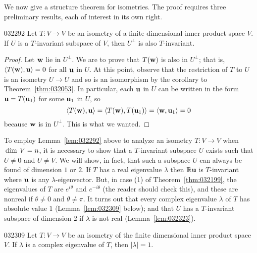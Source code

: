 We now give a structure theorem for isometries. The proof requires three preliminary results, each of interest in its own right.

\begin{lemma}{}{032292}
Let $T : V \to V$ be an isometry of a finite dimensional inner product space $V$. If $U$ is a $T$-invariant subspace of $V$, then $U^{\perp}$ is also $T$-invariant.
\end{lemma}

\begin{proof}
Let $\textbf{w}$ lie in $U^{\perp}$. We are to prove that $T(\textbf{w})$ is also in $U^{\perp}$; that is, $\langle T(\textbf{w}), \textbf{u} \rangle = 0$ for all $\textbf{u}$ in $U$. At this point, observe that the restriction of $T$ to $U$ is an isometry $U \to U$ and so is an isomorphism by the corollary to Theorem~\ref{thm:032053}. In particular, each $\textbf{u}$ in $U$ can be written in the form $\textbf{u} = T(\textbf{u}_{1})$ for some $\textbf{u}_{1}$ in $U$, so
\begin{equation*}
\langle T(\textbf{w}), \textbf{u} \rangle = \langle T(\textbf{w}), T(\textbf{u}_1) \rangle = \langle \textbf{w}, \textbf{u}_1 \rangle = 0
\end{equation*}
because $\textbf{w}$ is in $U^{\perp}$. This is what we wanted.
\end{proof}

To employ Lemma~\ref{lem:032292} above to analyze an isometry $T : V \to V$ when $\thinspace\operatorname{dim\medspace} V = n$, it is necessary to show that a $T$-invariant subspace $U$ exists such that $U \neq 0$ and $U \neq V$. We will show, in fact, that such a subspace $U$ can always be found of dimension $1$ or $2$. If $T$ has a real eigenvalue $\lambda$ then $\mathbb{R}\textbf{u}$ is $T$-invariant where $\textbf{u}$ is any $\lambda$-eigenvector. But, in case (1) of Theorem~\ref{thm:032199}, the eigenvalues of $T$ are $e^{i\theta}$ and $e^{-i\theta}$ (the reader should check this), and these are nonreal if $\theta \neq 0$ and $\theta \neq \pi$. It turns out that every complex eigenvalue $\lambda$ of $T$ has absolute value $1$ (Lemma~\ref{lem:032309} below); and that $U$ has a $T$-invariant subspace of dimension $2$ if $\lambda$ is not real (Lemma~\ref{lem:032323}).

\begin{lemma}{}{032309}
Let $T : V \to V$ be an isometry of the finite dimensional inner product space $V$. If $\lambda$ is a complex eigenvalue of $T$, then $|\lambda| = 1$.
\end{lemma}

